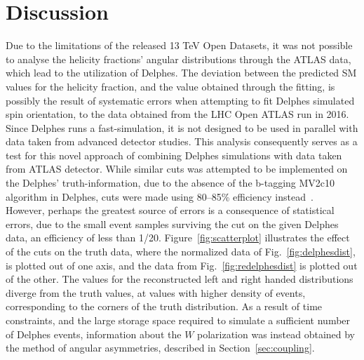 \documentclass[12pt,a4paper]{article}
\numberwithin{equation}{section}
\begin{document}
\section{Discussion}
Due to the limitations of the released 13 TeV Open Datasets, it was not possible
to analyse the helicity fractions' angular distributions through the ATLAS data,
which lead to the utilization of Delphes. The deviation between the predicted SM
values for the helicity fraction, and the value obtained through the fitting, is
possibly the result of systematic errors when attempting to fit Delphes
simulated spin orientation, to the data obtained from the LHC Open ATLAS run in
2016. Since Delphes runs a fast-simulation, it is not designed to be used in
parallel with data taken from advanced detector studies. This analysis
consequently serves as a test for this novel approach of combining Delphes
simulations with data taken from ATLAS detector. While similar cuts was
attempted to be implemented on the Delphes' truth-information, due to the
absence of the b-tagging MV2c10 algorithm in Delphes, cuts were made using
80--85\% efficiency instead~\cite{CMS-PAS-BTV-11-004}.\\

However, perhaps the greatest source of errors is a consequence of statistical
errors, due to the small event samples surviving the cut on the given Delphes
data, an efficiency of less than 1/20. Figure~\ref{fig:scatterplot} illustrates
the effect of the cuts on the truth data, where the normalized data of
Fig.~\ref{fig:delphesdist}, is plotted out of one axis, and the data from
Fig.~\ref{fig:redelphesdist} is plotted out of the other. The values for the
reconstructed left and right handed distributions diverge from the truth values,
at values with higher density of events, corresponding to the corners of the
truth distribution. As a result of time constraints, and the large storage space
required to simulate a sufficient number of Delphes events, information about
the $W$ polarization was instead obtained by the method of angular asymmetries,
described in Section~\ref{sec:coupling}.\\

\end{document}

